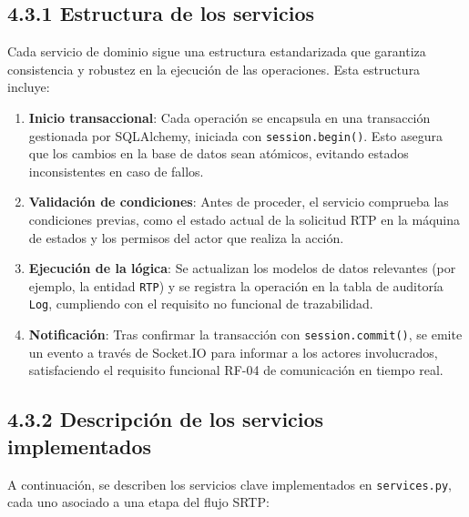 \subsection*{4.3.1 Estructura de los servicios}

Cada servicio de dominio sigue una estructura estandarizada que garantiza consistencia y robustez en la ejecución de las operaciones. Esta estructura incluye:

\begin{enumerate}
    \item \textbf{Inicio transaccional}: Cada operación se encapsula en una transacción gestionada por SQLAlchemy, iniciada con \texttt{session.begin()}. Esto asegura que los cambios en la base de datos sean atómicos, evitando estados inconsistentes en caso de fallos.
    \item \textbf{Validación de condiciones}: Antes de proceder, el servicio comprueba las condiciones previas, como el estado actual de la solicitud RTP en la máquina de estados y los permisos del actor que realiza la acción.
    \item \textbf{Ejecución de la lógica}: Se actualizan los modelos de datos relevantes (por ejemplo, la entidad \texttt{RTP}) y se registra la operación en la tabla de auditoría \texttt{Log}, cumpliendo con el requisito no funcional de trazabilidad.
    \item \textbf{Notificación}: Tras confirmar la transacción con \texttt{session.commit()}, se emite un evento a través de Socket.IO para informar a los actores involucrados, satisfaciendo el requisito funcional RF-04 de comunicación en tiempo real.
\end{enumerate}

\subsection*{4.3.2 Descripción de los servicios implementados}

A continuación, se describen los servicios clave implementados en \texttt{services.py}, cada uno asociado a una etapa del flujo SRTP:

